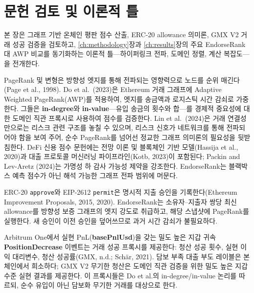 \chapter{문헌 검토 및 이론적 틀}
\label{ch:literature}

본 장은 그래프 기반 온체인 평판 점수 산출, ERC-20 allowance 의미론, GMX V2 거래 성공 검증을 검토하고, \ref{ch:methodology}장과 \ref{ch:results}장의 주요 EndorseRank 대 AWP 비교를 동기화하는 이론적 틀---하이퍼링크 전파, 도메인 정렬, 계산 복잡도---을 전개한다.


PageRank 및 변형은 방향성 엣지를 통해 전파되는 영향력으로 노드를 순위 매긴다(Page et al., 1998). Do et al.\ (2023)은 Ethereum 거래 그래프에 Adaptive Weighted PageRank(AWP)를 적용하여, 엣지를 송금액과 로지스틱 시간 감쇠로 가중한다. 그들은 \textbf{in-degree}와 \textbf{in-value}---유입 송금의 횟수와 합---를 경제적 중요성에 대한 도메인 직관 프록시로 사용하여 점수를 검증한다. Lin et al.\ (2024)은 거래 연결성만으로는 리스크 관련 구조를 놓칠 수 있으며, 리스크 신호가 네트워크를 통해 전파되어야 함을 보여 주어, 순수 PageRank를 넘어선 정교한 그래프 의미론의 필요성을 뒷받침한다. DeFi 신용 점수 문헌에는 전망 이론 및 블록체인 기반 모델(Hassija et al., 2020)과 대출 프로토콜 머신러닝 파이프라인(Kotb, 2023)이 포함된다; Packin and Lev-Aretz (2024)는 가명성 하 감사 가능성 제약을 강조한다. EndorseRank는 블랙박스 예측 점수가 아닌 해석 가능한 그래프 전파 범위에 머문다.


ERC-20 \texttt{approve}와 EIP-2612 \texttt{permit}은 명시적 지출 승인을 기록한다(Ethereum Improvement Proposals, 2015, 2020). EndorseRank는 소유자--지출자 쌍당 최신 allowance를 방향성 보증 그래프의 엣지 강도로 취급하고, 해당 스냅샷에 PageRank를 실행한다. 새 승인이 이전 승인을 덮어쓰므로 과거 시간 감쇠가 불필요하다.


Arbitrum One에서 실현 PnL(\textbf{basePnlUsd})을 갖는 밀도 높은 지갑 귀속 \textbf{PositionDecrease} 이벤트는 거래 성공 프록시를 제공한다: 청산 성공 횟수, 실현 이익 대리변수, 청산 성공률(GMX, n.d.; Sch\"{a}r, 2021). 담보 부족 대출 부도 레이블은 본 체인에서 희소하다; GMX V2 무기한 청산은 도메인 직관 검증을 위한 밀도 높은 지갑 수준 실현 결과를 제공한다. 이 프록시들은 Do et al.의 in-degree/in-value 논리를 따르되, 순수 유입이 아닌 담보화 무기한 거래를 대상으로 한다.

